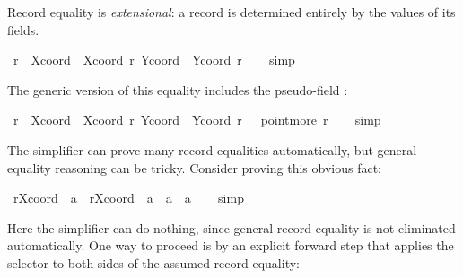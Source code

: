 \begin{isabellebody}
\begin{isamarkuptext}
  Record equality is \emph{extensional}:
   a record is determined entirely
  by the values of its fields.%
\end{isamarkuptext}%
\isamarkuptrue%
\isamarkupfalse%
\ {\isachardoublequoteopen}r\ {\isacharequal}\ {\isasymlparr}Xcoord\ {\isacharequal}\ Xcoord\ r{\isacharcomma}\ Ycoord\ {\isacharequal}\ Ycoord\ r{\isasymrparr}{\isachardoublequoteclose}\isanewline
%
\isadelimproof
\ \ %
\endisadelimproof
%
\isatagproof
{}\isamarkupfalse%
\ simp%
\endisatagproof
{\isafoldproof}%
%
\isadelimproof
%
\endisadelimproof
%
\begin{isamarkuptext}%
\noindent
  The generic version of this equality includes the pseudo-field
  :%
\end{isamarkuptext}%
\isamarkuptrue%
\isamarkupfalse%
\ {\isachardoublequoteopen}r\ {\isacharequal}\ {\isasymlparr}Xcoord\ {\isacharequal}\ Xcoord\ r{\isacharcomma}\ Ycoord\ {\isacharequal}\ Ycoord\ r{\isacharcomma}\ {\isasymdots}\ {\isacharequal}\ point{\isachardot}more\ r{\isasymrparr}{\isachardoublequoteclose}\isanewline
%
\isadelimproof
\ \ %
\endisadelimproof
%
\isatagproof
{}\isamarkupfalse%
\ simp%
\endisatagproof
{\isafoldproof}%
%
\isadelimproof
%
\endisadelimproof
%
\begin{isamarkuptext}%
The simplifier can prove many record equalities
  automatically, but general equality reasoning can be tricky.
  Consider proving this obvious fact:%
\end{isamarkuptext}%
\isamarkuptrue%
\isamarkupfalse%
\ {\isachardoublequoteopen}r{\isasymlparr}Xcoord\ {\isacharcolon}{\isacharequal}\ a{\isasymrparr}\ {\isacharequal}\ r{\isasymlparr}Xcoord\ {\isacharcolon}{\isacharequal}\ a{\isacharprime}{\isasymrparr}\ {\isasymLongrightarrow}\ a\ {\isacharequal}\ a{\isacharprime}{\isachardoublequoteclose}\isanewline
%
\isadelimproof
\ \ %
\endisadelimproof
%
\isatagproof
{}\isamarkupfalse%
\ simp{\isacharquery}\isanewline
\ \ \isamarkupfalse%
%
\endisatagproof
{\isafoldproof}%
%
\isadelimproof
%
\endisadelimproof
%
\begin{isamarkuptext}%
\noindent
  Here the simplifier can do nothing, since general record equality is
  not eliminated automatically.  One way to proceed is by an explicit
  forward step that applies the selector  to both sides
  of the assumed record equality:%
\end{isamarkuptext}%
\isamarkuptrue%
\isamarkupfalse%

\end{isabellebody}
